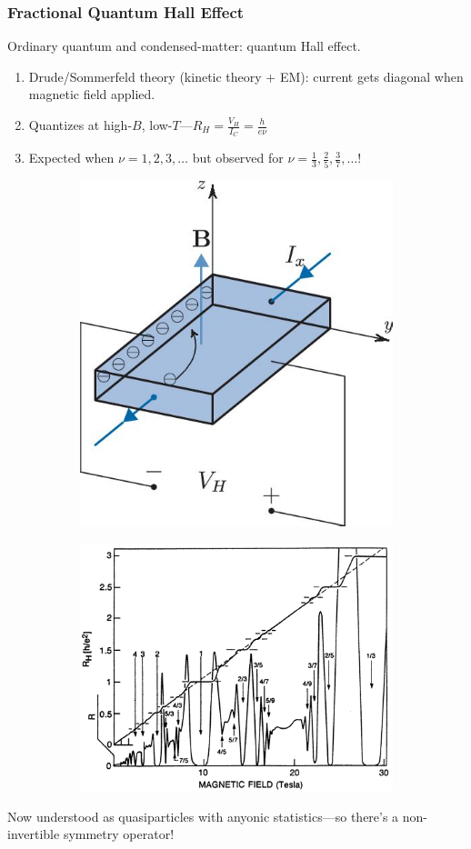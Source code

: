 \documentclass[10pt]{beamer}
\begin{document}
\begin{frame}
  \frametitle{Fractional Quantum Hall Effect}
  Ordinary quantum and condensed-matter: quantum Hall effect.
  \begin{enumerate}
  \item Drude/Sommerfeld theory (kinetic theory + EM): current gets diagonal when magnetic field applied.
  \item Quantizes at high-$B$, low-$T$---$R_{H} = \frac{V_{H}}{I_{C}} = \frac{h}{e\nu}$
  \item Expected when $\nu = 1, 2, 3,\ldots$ but observed for $\nu = \frac{1}{3}, \frac{2}{5}, \frac{3}{7}, \ldots$!
  \end{enumerate}
  \begin{figure}
    \begin{subfigure}{0.5\textwidth}
      \centering
      \includegraphics[width=0.6\linewidth]{he-app.png}
    \end{subfigure}%
    \begin{subfigure}{0.5\textwidth}
      \centering
      \includegraphics[scale=0.17]{fqhe.png}
    \end{subfigure}
  \end{figure}
  Now understood as quasiparticles with anyonic statistics---so there's a non-invertible symmetry operator!
\end{frame}
\end{document}
